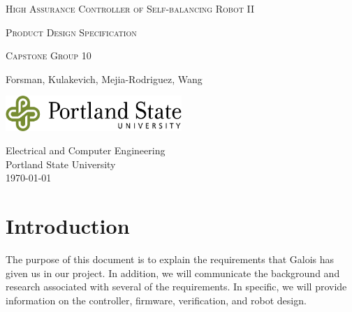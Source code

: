 \documentclass[a4paper,12pt]{article}
\newcommand{\authorname}{Forsman, Kulakevich, Mejia-Rodriguez, Wang}
\newcommand{\classnumber}{Capstone Group 10}
\newcommand{\projectname}{High Assurance Controller of Self-balancing Robot II}
\begin{document}

\begin{titlepage}
	\begin{center}
		\vspace*{1cm}

		\huge\textsc{\projectname}
		\vspace*{1cm}

		\textsc{Product Design Specification}

		\vspace{0.5cm}
		\small\textsc{\classnumber}
		
		\vspace{1.5cm}
		\normalsize \authorname 
		
		\vspace{0.5cm}
		
		\vfill
		\vspace{0.8cm}
		
		\includegraphics[width=0.5\textwidth]{images/psulogo_horiz_msword.tif}
		
		\vspace{0.5cm}
		Electrical and Computer Engineering\\
		Portland State University\\
		\today
		 
	\end{center}
\end{titlepage}
\begin{versionhistory}
    \renewcommand \vhAuthorColWidth{.8\hsize}
    \renewcommand \vhChangeColWidth{1.2\hsize}
\end{versionhistory}

\newpage
\tableofcontents 


\newpage
{}

\section{Introduction}
	The purpose of this document is to explain the requirements that Galois has given us in our project. In addition, we will communicate the background and research associated with several of the requirements. In specific, we will provide information on the controller, firmware, verification, and robot design.
	
\end{document}
